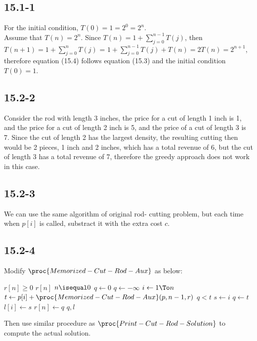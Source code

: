 \subsection{15.1-1}
    For the initial condition, $T(0) = 1 = 2^0
    = 2^n$.\\
    Assume that $T(n) = 2^n$. Since $T(n) = 
    1 + \sum_{j = 0}^{n-1}T(j)$, then $T(n+1)
    = 1 + \sum_{j = 0}^{n}T(j)$ = $1 + \sum
    _{j = 0}^{n - 1}T(j) + T(n) = 2T(n) = 
    2^{n+1}$, therefore equation (15.4) follows
    equation (15.3) and the initial condition
    $T(0) = 1$.
\subsection{15.2-2}
    Consider the rod with length 3 inches, the 
    price for a cut of length 1 inch is 1, and
    the price for a cut of length 2 inch is
    5, and the price of a cut of length 3 is 7.
    Since the cut of length 2 has the largest
    density, the resulting cutting then would be
    2 pieces, 1 inch and 2 inches, which has a
    total revenue of 6, but the cut of length 3
    has a total revenue of 7, therefore the 
    greedy approach does not work in this case.
\subsection{15.2-3}
    We can use the same algorithm of original rod-
    cutting problem, but each time when $p[i]$ 
    is called, substract it with the extra cost $c$.
\subsection{15.2-4}
    Modify $\proc{Memorized-Cut-Rod-Aux}$ as below:
    \begin{codebox}
        \li \If $r[n] \ge 0$
            \Then
        \li     \Return $r[n]$
            \End
        \li \If $n \isequal 0$
            \Then
        \li     $q \gets 0$
        \li \Else $q \gets -\infty$
        \li     \For $i \gets 1 \To n$
                \Do
        \li         $t \gets p[i] + \proc{Memorized-Cut-Rod-Aux}(p, n - 1, r)$
        \li         \If $q < t$
                    \Then
        \li             $s \gets i$
        \li             $q \gets t$
                    \End
        \li         $l[i] \gets s$
                \End
            \End
        \li $r[n] \gets q$
        \li \Return $q, l$
    \end{codebox}
    Then use similar procedure as $\proc{Print-Cut-Rod-Solution}$ to
    compute the actual solution.
